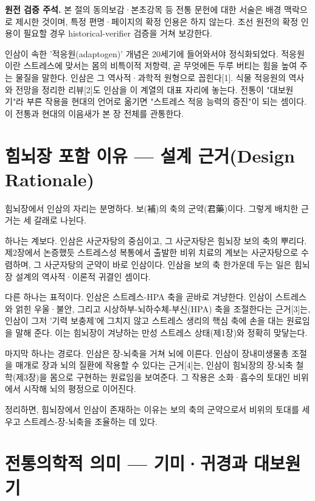 \documentclass[12pt,oneside]{book}
\newenvironment{authnote}
  {\par\smallskip\begingroup\leftskip=6mm\rightskip=3mm\small\color{muted}\noindent\ignorespaces}
  {\par\endgroup\smallskip}
\begin{document}
\begin{authnote}\textbf{원전 검증 주석.} 본 절의 동의보감·본초강목 등 전통 문헌에 대한 서술은 배경 맥락으로 제시한 것이며, 특정 편명·페이지의 확정 인용은 하지 않는다. 조선 원전의 확정 인용이 필요할 경우 historical-verifier 검증을 거쳐 보강한다.\end{authnote}

인삼이 속한 '적응원(adaptogen)' 개념은 20세기에 들어와서야 정식화되었다. 적응원이란 스트레스에 맞서는 몸의 비특이적 저항력, 곧 무엇에든 두루 버티는 힘을 높여 주는 물질을 말한다. 인삼은 그 역사적·과학적 원형으로 꼽힌다[1]. 식물 적응원의 역사와 전망을 정리한 리뷰[2]도 인삼을 이 계열의 대표 자리에 놓는다. 전통이 "대보원기"라 부른 작용을 현대의 언어로 옮기면 "스트레스 적응 능력의 증진"이 되는 셈이다. 이 전통과 현대의 이음새가 본 장 전체를 관통한다.

\section{힘뇌장 포함 이유 — 설계 근거(Design Rationale)}

힘뇌장에서 인삼의 자리는 분명하다. 보(補)의 축의 군약(君藥)이다. 그렇게 배치한 근거는 세 갈래로 나뉜다.

하나는 계보다. 인삼은 사군자탕의 중심이고, 그 사군자탕은 힘뇌장 보의 축의 뿌리다. 제2장에서 논증했듯 스트레스성 복통에서 출발한 비위 치료의 계보는 사군자탕으로 수렴하며, 그 사군자탕의 군약이 바로 인삼이다. 인삼을 보의 축 한가운데 두는 일은 힘뇌장 설계의 역사적·이론적 귀결인 셈이다.

다른 하나는 표적이다. 인삼은 스트레스-HPA 축을 곧바로 겨냥한다. 인삼이 스트레스와 얽힌 우울·불안, 그리고 시상하부-뇌하수체-부신(HPA) 축을 조절한다는 근거[3]는, 인삼이 그저 '기력 보충제'에 그치지 않고 스트레스 생리의 핵심 축에 손을 대는 원료임을 말해 준다. 이는 힘뇌장이 겨냥하는 만성 스트레스 상태(제1장)와 정확히 맞닿는다.

마지막 하나는 경로다. 인삼은 장-뇌축을 거쳐 뇌에 이른다. 인삼이 장내미생물총 조절을 매개로 장과 뇌의 질환에 작용할 수 있다는 근거[4]는, 인삼이 힘뇌장의 장-뇌축 철학(제3장)을 몸으로 구현하는 원료임을 보여준다. 그 작용은 소화·흡수의 토대인 비위에서 시작해 뇌의 평정으로 이어진다.

정리하면, 힘뇌장에서 인삼이 존재하는 이유는 보의 축의 군약으로서 비위의 토대를 세우고 스트레스-장-뇌축을 조율하는 데 있다.

\section{전통의학적 의미 — 기미·귀경과 대보원기}
\end{document}

